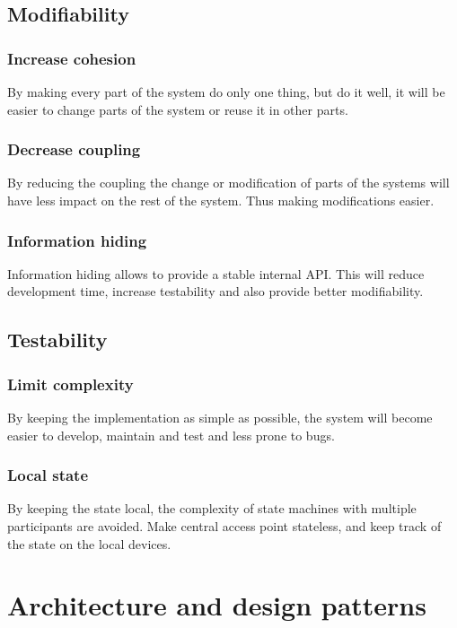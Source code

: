 \documentclass[11pt]{book}
\begin{document}
\subsection{Modifiability}

\subsubsection{Increase cohesion}
By making every part of the system do only one thing, but do it well, it will be easier to change parts of the system or reuse it in other parts.

\subsubsection{Decrease coupling}
By reducing the coupling the change or modification of parts of the systems will have less impact on the rest of the system. Thus making modifications easier.

\subsubsection{Information hiding}
Information hiding allows to provide a stable internal API. This will reduce development time, increase testability and also provide better modifiability.

\subsection{Testability}

\subsubsection{Limit complexity}
By keeping the implementation as simple as possible, the system will become easier to develop, maintain and test and less prone to bugs.

\subsubsection{Local state}
By keeping the state local, the complexity of state machines with multiple participants are avoided. Make central access point stateless, and keep track of the state on the local devices.

\section{Architecture and design patterns}
\end{document}
